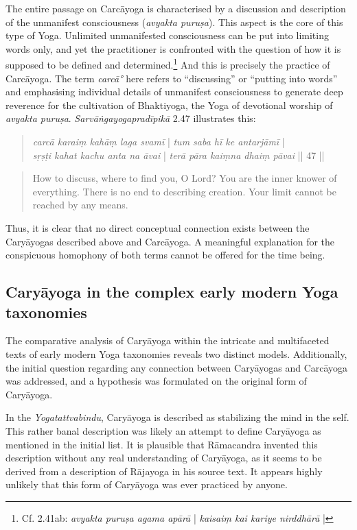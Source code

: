 The entire passage on Carcāyoga is characterised by a discussion and description of the unmanifest consciousness (\textit{avyakta puruṣa}). This aspect is the core of this type of Yoga. Unlimited unmanifested consciousness can be put into limiting words only, and yet the practitioner is confronted with the question of how it is supposed to be defined and determined.\footnote{Cf.  2.41ab: \textit{avyakta puruṣa agama apārā} | \textit{kaisaiṃ kai kariye nirddhārā} |} And this is precisely the practice of Carcāyoga. The term \textit{carcā°} here refers to ``discussing'' or ``putting into words'' and emphasising individual details of unmanifest consciousness to generate deep reverence for the cultivation of Bhaktiyoga, the Yoga of devotional worship of \textit{avyakta puruṣa}. \textit{Sarvāṅgayogapradīpikā} 2.47 illustrates this:
\begin{quote}
  \textit{carcā karaiṃ kahāṃ laga svamī} | \textit{tum saba hī ke antarjāmī} | \\
  \textit{sṛṣṭi kahat kachu anta na āvai} | \textit{terā pāra kaiṃna dhaiṃ pāvai} || 47 ||
  \end{quote}
\begin{quote}
How to discuss, where to find you, O Lord? You are the inner knower of everything. There is no end to describing creation. Your limit cannot be reached by any means.
\end{quote}

Thus, it is clear that no direct conceptual connection exists between the Caryāyogas described above and Carcāyoga. A meaningful explanation for the conspicuous homophony of both terms cannot be offered for the time being.  

\subsection{Caryāyoga in the complex early modern Yoga taxonomies}

The comparative analysis of Caryāyoga within the intricate and multifaceted texts of early modern Yoga taxonomies reveals two distinct models. Additionally, the initial question regarding any connection between Caryāyogas and Carcāyoga was addressed, and a hypothesis was formulated on the original form of Caryāyoga.

In the \textit{Yogatattvabindu}, Caryāyoga is described as stabilizing the mind in the self. This rather banal description was likely an attempt to define Caryāyoga as mentioned in the initial list. It is plausible that Rāmacandra invented this description without any real understanding of Caryāyoga, as it seems to be derived from a description of Rājayoga in his source text. It appears highly unlikely that this form of Caryāyoga was ever practiced by anyone.

